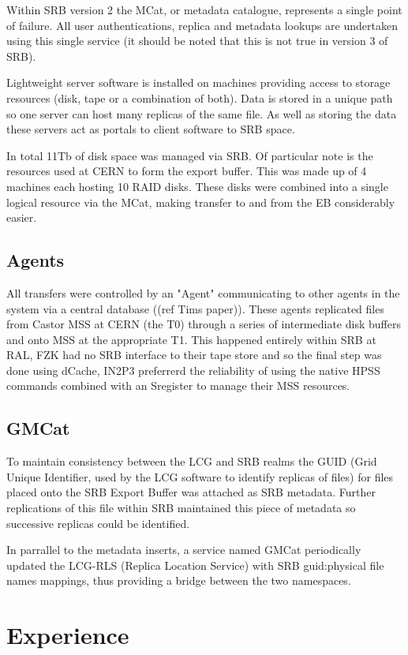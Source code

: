 \documentclass{cmspaper}
\begin{document}
Within SRB version 2 the MCat, or metadata catalogue, represents a single point of failure. All 
user authentications, replica and metadata lookups are undertaken using this single service 
(it should be noted that this is not true in version 3 of SRB).

Lightweight server software is installed on machines providing access to storage resources 
(disk, tape or a combination of both). Data is stored in a unique path so one server can host 
many replicas of the same file. As well as storing the data these servers act as portals to 
client software to SRB space. 

In total 11Tb of disk space was managed via SRB. Of particular note is the resources used at 
CERN to form the export buffer. This was made up of 4 machines each hosting 10 RAID disks. These
disks were combined into a single logical resource via the MCat, making transfer to and from the 
EB considerably easier.

\subsection{Agents}
All transfers were controlled by an "Agent" communicating to other agents in the system via a central
database ((ref Tims paper)). These agents replicated files from Castor MSS at CERN (the T0) through a 
series of intermediate disk buffers and onto MSS at the appropriate T1. This happened entirely within 
SRB at RAL, FZK had no SRB interface to their tape store and so the final step was done using dCache,
IN2P3 preferrerd the reliability of using the native HPSS commands combined with an Sregister
to manage their MSS resources.

\subsection{GMCat}
To maintain consistency between the LCG and SRB realms the GUID (Grid Unique Identifier, used 
by the LCG software to identify replicas of files) for files placed onto the SRB Export Buffer 
was attached as SRB metadata. Further replications of this file within SRB maintained this
piece of metadata so successive replicas could be identified.

In parrallel to the metadata inserts, a service named GMCat periodically updated the 
LCG-RLS (Replica Location Service) with SRB guid:physical file names mappings, thus 
providing a bridge between the two namespaces.

\section{Experience}
\end{document}
